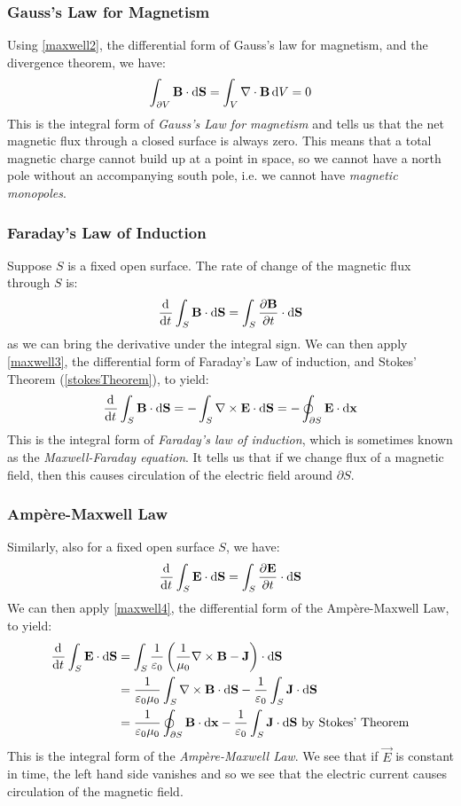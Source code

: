 \documentclass[../main.tex]{subfiles}
\begin{document}
\subsubsection{Gauss's Law for Magnetism}
Using \cref{maxwell2}, the differential form of Gauss's law for magnetism, and the divergence theorem, we have:
\[
  \int_{\partial V} \vec{B} \cdot \d{\vec{S}} = \int_{V} \nabla \cdot \vec{B} \d{V} = 0
\]
This is the integral form of \textit{Gauss's Law for magnetism} and tells us that the net magnetic flux through a closed surface is always zero.
This means that a total magnetic charge cannot build up at a point in space, so we cannot have a north pole without an accompanying south pole, i.e. we cannot have \textit{magnetic monopoles}.
\subsubsection{Faraday's Law of Induction}
\nonexaminable
Suppose $S$ is a fixed open surface.
The rate of change of the magnetic flux through $S$ is:
\[
  \deriv{}{t}\int_{S} \vec{B} \cdot \d{\vec{S}} = \int_{S} \pderiv{\vec{B}}{t} \cdot \d{\vec{S}}
\]
as we can bring the derivative under the integral sign.
We can then apply \cref{maxwell3}, the differential form of Faraday's Law of induction, and Stokes' Theorem (\cref{stokesTheorem}), to yield:
\[
  \deriv{}{t}\int_{S} \vec{B} \cdot \d{\vec{S}} = - \int_{S} \nabla \times \vec{E} \cdot \d{\vec{S}} = -\oint_{\partial S} \vec{E} \cdot \d{\vec{x}}
\]
This is the integral form of \textit{Faraday's law of induction}, which is sometimes known as the \textit{Maxwell-Faraday equation}.
It tells us that if we change flux of a magnetic field, then this causes circulation of the electric field around $\partial S$.
\subsubsection{Amp\`ere-Maxwell Law}
\nonexaminable
Similarly, also for a fixed open surface $S$, we have:
\[
  \deriv{}{t} \int_{S} \vec{E} \cdot \d{\vec{S}} = \int_{S} \pderiv{\vec{E}}{t} \cdot \d{\vec{S}}
\]
We can then apply \cref{maxwell4}, the differential form of the Amp\`ere-Maxwell Law, to yield:
\begin{align*}
  \deriv{}{t} \int_{S} \vec{E} \cdot \d{\vec{S}} &= \int_{S} \frac{1}{\varepsilon_0}\left(\frac{1}{\mu_0} \nabla \times \vec{B} - \vec{J}\right) \cdot \d{\vec{S}} \\
                                                 &= \frac{1}{\varepsilon_0\mu_0} \int_{S} \nabla \times \vec{B} \cdot \d{\vec{S}} - \frac{1}{\varepsilon_0} \int_{S} \vec{J} \cdot \d{\vec{S}} \\
                                                 &= \frac{1}{\varepsilon_0\mu_0} \oint_{\partial S} \vec{B} \cdot \d{\vec{x}}  - \frac{1}{\varepsilon_0} \int_{S} \vec{J} \cdot \d{\vec{S}} \text{ by Stokes' Theorem}
\end{align*}
This is the integral form of the \textit{Amp\`ere-Maxwell Law}.
We see that if $\vec{E}$ is constant in time, the left hand side vanishes and so we see that the electric current causes circulation of the magnetic field.
\end{document}
